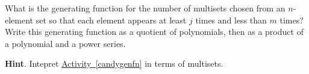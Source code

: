 \documentclass{book}
\begin{document}
\setcounter{cpjt}{257}
\addtocounter{cpjt}{-1}
\begin{activity}\label{activity-250}
\hypertarget{p-1329}{}%
What is the generating function for the number of multisets chosen from an \(n\)-element set so that each element appears at least \(j\) times and less than \(m\) times? Write this generating function as a quotient of polynomials, then as a product of a polynomial and a power series.%
\par\smallskip%
\noindent\textbf{Hint}.\hypertarget{hint-166}{}\quad%
\hypertarget{p-1330}{}%
Intepret \hyperref[candygenfn]{Activity~\ref{candygenfn}} in terms of multisets.%
\par\smallskip%
\noindent\end{activity}

\clearpage
\end{document}
